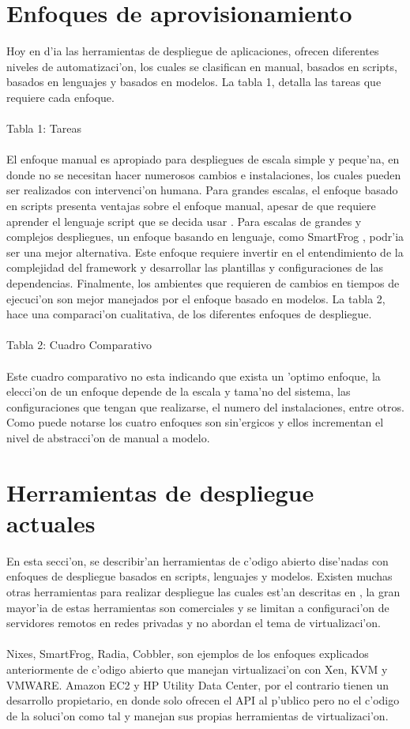 \section{Enfoques de aprovisionamiento}
Hoy en d'ia las herramientas de despliegue de aplicaciones, ofrecen diferentes niveles de automatizaci'on, los cuales se clasifican en manual, basados en scripts, basados en lenguajes y basados en modelos. La tabla 1, detalla las tareas que requiere cada enfoque.\\
\\
Tabla 1: Tareas\\
\\
El enfoque manual es apropiado para despliegues de escala simple y peque'na, en donde no se necesitan hacer numerosos cambios e instalaciones, los cuales pueden ser realizados con intervenci'on humana. Para grandes escalas, el enfoque basado en scripts presenta ventajas sobre el enfoque manual, apesar de que requiere aprender el lenguaje script que se decida usar \cite{2}. Para escalas de grandes y complejos despliegues, un enfoque basando en lenguaje, como SmartFrog \cite{3}, podr'ia ser una mejor alternativa. Este enfoque requiere invertir en el entendimiento de la complejidad del framework y desarrollar las plantillas y configuraciones de las dependencias. Finalmente, los ambientes que requieren de cambios en tiempos de ejecuci'on son mejor manejados por el enfoque basado en modelos. La tabla 2, hace una comparaci'on cualitativa, de los diferentes enfoques de despliegue.\\
\\
Tabla 2: Cuadro Comparativo\\
\\
Este cuadro comparativo no esta indicando que exista un 'optimo enfoque, la elecci'on de un enfoque depende de la escala y tama'no del sistema, las configuraciones que tengan que realizarse, el numero del instalaciones, entre otros. Como puede notarse los cuatro enfoques son sin'ergicos y ellos incrementan el nivel de abstracci'on de manual a modelo. 

\section{Herramientas de despliegue actuales}
En esta secci'on, se describir'an herramientas de c'odigo abierto dise'nadas con enfoques de despliegue basados en scripts, lenguajes y modelos. Existen muchas otras herramientas para realizar despliegue las cuales est'an descritas en \cite{12}, la gran mayor'ia de estas herramientas son comerciales y se limitan a configuraci'on de servidores remotos en redes privadas y no abordan el tema de virtualizaci'on.\\
\\
Nixes, SmartFrog, Radia, Cobbler, son ejemplos de los enfoques explicados anteriormente de c'odigo abierto que manejan virtualizaci'on con Xen, KVM y VMWARE. Amazon EC2 y HP Utility Data Center, por el contrario tienen un desarrollo propietario, en donde solo ofrecen el API al p'ublico pero no el c'odigo de la soluci'on como tal y manejan sus propias herramientas de virtualizaci'on.

